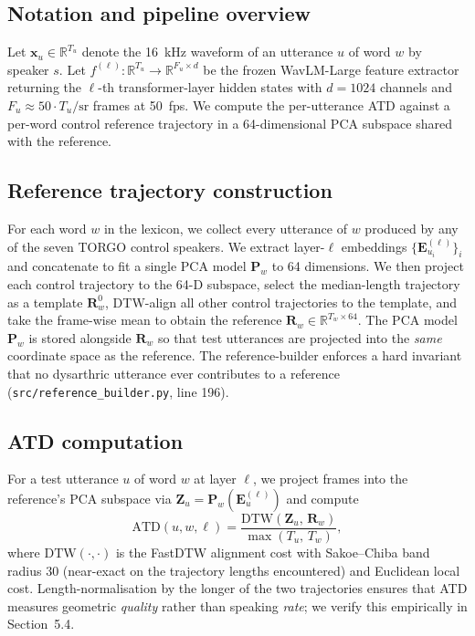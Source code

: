 
\subsection{Notation and pipeline overview}
Let $\mathbf{x}_u \in \mathbb{R}^{T_u}$ denote the 16~kHz waveform of an
utterance $u$ of word $w$ by speaker $s$. Let $f^{(\ell)}: \mathbb{R}^{T_u}
\to \mathbb{R}^{F_u \times d}$ be the frozen WavLM-Large feature extractor
returning the $\ell$-th transformer-layer hidden states with $d = 1024$
channels and $F_u \approx 50 \cdot T_u / \mathrm{sr}$ frames at 50~fps. We
compute the per-utterance ATD against a per-word control reference
trajectory in a 64-dimensional PCA subspace shared with the reference.

\subsection{Reference trajectory construction}
For each word $w$ in the lexicon, we collect every utterance of $w$
produced by any of the seven TORGO control speakers. We extract layer-$\ell$
embeddings $\{\mathbf{E}^{(\ell)}_{u_i}\}_i$ and concatenate to fit a
single PCA model $\mathbf{P}_w$ to 64 dimensions. We then project each
control trajectory to the 64-D subspace, select the median-length
trajectory as a template $\mathbf{R}_w^{0}$, DTW-align all other control
trajectories to the template, and take the frame-wise mean to obtain the
reference $\mathbf{R}_w \in \mathbb{R}^{T_w \times 64}$. The PCA model
$\mathbf{P}_w$ is stored alongside $\mathbf{R}_w$ so that test utterances
are projected into the \emph{same} coordinate space as the reference. The
reference-builder enforces a hard invariant that no dysarthric utterance
ever contributes to a reference (\texttt{src/reference\_builder.py}, line 196).

\subsection{ATD computation}
For a test utterance $u$ of word $w$ at layer $\ell$, we project frames
into the reference's PCA subspace via $\mathbf{Z}_u = \mathbf{P}_w(
\mathbf{E}^{(\ell)}_u )$ and compute
\begin{equation}
\mathrm{ATD}(u, w, \ell) =
   \frac{ \mathrm{DTW}\!\left( \mathbf{Z}_u,\, \mathbf{R}_w \right) }
        { \max\!\left( T_u,\, T_w \right) },
\label{eq:atd}
\end{equation}
where $\mathrm{DTW}(\cdot,\cdot)$ is the FastDTW alignment cost with
Sakoe--Chiba band radius 30 (near-exact on the trajectory lengths
encountered) and Euclidean local cost. Length-normalisation by the longer
of the two trajectories ensures that ATD measures geometric \emph{quality}
rather than speaking \emph{rate}; we verify this empirically in
Section~5.4.

